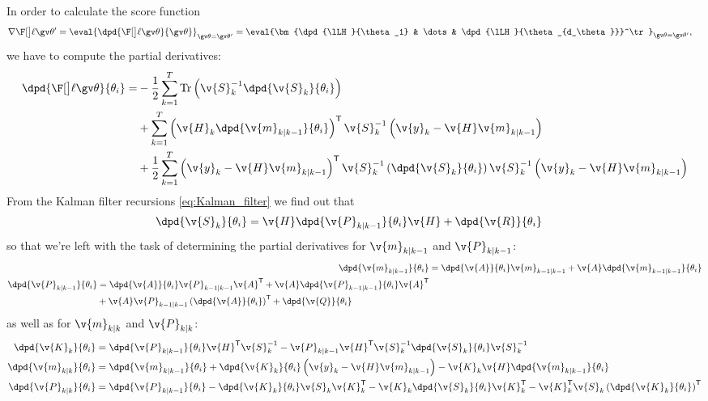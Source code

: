 In order to calculate the score function
\begin{align}
	\score[\Th']&=\eval{\dpd{\lLH}{\Th}}_{\Th=\Th'}
	=\eval{\bm{\dpd{\lLH}{\theta_1} & \dots & \dpd{\lLH}{\theta_{d_\theta}}}^\tr}_{\Th=\Th'},
	\label{eq:score}
\end{align}
we have to compute the partial
derivatives:
\begin{align}
\begin{split}
	\dpd{\lLH}{\theta_i}
	=&-\frac{1}{2}\sum_{k=1}^T\mathrm{Tr}\left(\v{S}_{k}^{-1}\dpd{\v{S}_k}{\theta_i}\right)\\
	&+\sum_{k=1}^T\left(\v{H}_k\dpd{\v{m}_{k|k-1}}{\theta_i}\right)^\tr\v{S}_{k}^{-1}\left(\v{y}_k-\v{H}\v{m}_{k|k-1}\right)\\
	&+\frac{1}{2}\sum_{k=1}^T\left(\v{y}_k-\v{H}\v{m}_{k|k-1}\right)^\tr\v{S}_{k}^{-1}\left(\dpd{\v{S}_k}{\theta_i}\right)\v{S}_{k}^{-1}\left(\v{y}_k-\v{H}\v{m}_{k|k-1}\right)\\
	\label{eq:dlogLH}
\end{split}
\end{align}
From the Kalman filter recursions \eqref{eq:Kalman_filter} we find out that 
\begin{align}
	\dpd{\v{S}_k}{\theta_i}&=\v{H}\dpd{\v{P}_{k|k-1}}{\theta_i}\v{H}+\dpd{\v{R}}{\theta_i}
\end{align}
so that we're left with the task of determining the partial derivatives for
$\v{m}_{k|k-1}$ and $\v{P}_{k|k-1}$:
\begin{align}
	\dpd{\v{m}_{k|k-1}}{\theta_i}&=\dpd{\v{A}}{\theta_i}\v{m}_{k-1|k-1}+\v{A}\dpd{\v{m}_{k-1|k-1}}{\theta_i} \label{eq:m_pred_pd}\\
	\begin{split}
	\dpd{\v{P}_{k|k-1}}{\theta_i}&=\dpd{\v{A}}{\theta_i}\v{P}_{k-1|k-1}\v{A}^\tr+\v{A}\dpd{\v{P}_{k-1|k-1}}{\theta_i}\v{A}^\tr\\
	&+\v{A}\v{P}_{k-1|k-1}\left(\dpd{\v{A}}{\theta_i}\right)^\tr+\dpd{\v{Q}}{\theta_i} \label{eq:P_pred_pd}
	\end{split}
\end{align}
as well as for $\v{m}_{k|k}$ and $\v{P}_{k|k}$:
\begin{align}
	\dpd{\v{K}_k}{\theta_i}&=\dpd{\v{P}_{k|k-1}}{\theta_i}\v{H}^\tr\v{S}_{k}^{-1}-\v{P}_{k|k-1}\v{H}^\tr\v{S}_{k}^{-1}\dpd{\v{S}_k}{\theta_i}\v{S}_{k}^{-1}
	\label{eq:K_pd}\\
	\dpd{\v{m}_{k|k}}{\theta_i}&=\dpd{\v{m}_{k|k-1}}{\theta_i}+\dpd{\v{K}_k}{\theta_i}\left(\v{y}_k-\v{H}\v{m}_{k|k-1}\right)-\v{K}_k\v{H}\dpd{\v{m}_{k|k-1}}{\theta_i}
	\label{eq:m_pd}\\
	\dpd{\v{P}_{k|k}}{\theta_i}&=\dpd{\v{P}_{k|k-1}}{\theta_i}-\dpd{\v{K}_k}{\theta_i}\v{S}_{k}\v{K}_{k}^\tr-\v{K}_{k}\dpd{\v{S}_k}{\theta_i}\v{K}_{k}^\tr-\v{K}_{k}^\tr\v{S}_{k}\left(\dpd{\v{K}_k}{\theta_i}\right)^\tr
	\label{eq:P_pd}
	\end{align}
